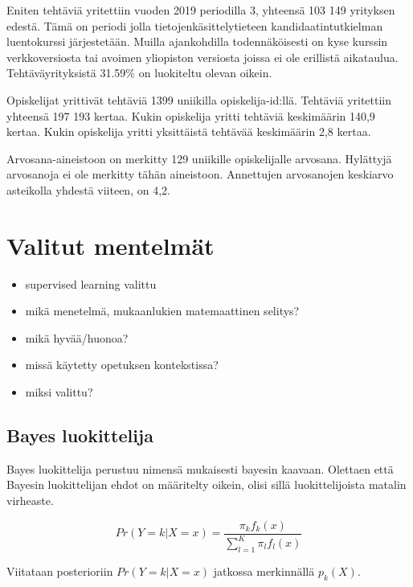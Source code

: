 \documentclass[finnish,twoside,openright]{HYgraduMLDS}
\begin{document}
Eniten tehtäviä yritettiin vuoden 2019 periodilla 3, yhteensä 103 149 yrityksen edestä. Tämä on periodi jolla tietojenkäsittelytieteen kandidaatintutkielman luentokurssi järjestetään. Muilla ajankohdilla todennäköisesti on kyse kurssin verkkoversiosta tai avoimen yliopiston versiosta joissa ei ole erillistä aikataulua. Tehtäväyrityksistä 31.59\% on luokiteltu olevan oikein.

Opiskelijat yrittivät tehtäviä 1399 uniikilla opiskelija-id:llä. Tehtäviä yritettiin yhteensä 197 193 kertaa. Kukin opiskelija yritti tehtäviä keskimäärin 140,9 kertaa. Kukin opiskelija yritti yksittäistä tehtävää keskimäärin 2,8 kertaa.

Arvosana-aineistoon on merkitty 129 uniikille opiskelijalle arvosana. Hylättyjä arvosanoja ei ole merkitty tähän aineistoon. Annettujen arvosanojen keskiarvo asteikolla yhdestä viiteen, on 4,2.

\section{Valitut mentelmät}

\begin{itemize}
    \item supervised learning valittu
\end{itemize}

\begin{itemize}
    \item mikä menetelmä, mukaanlukien matemaattinen selitys?
    \item mikä hyvää/huonoa?
    \item missä käytetty opetuksen kontekstissa?
    \item miksi valittu?
\end{itemize}

\subsection{Bayes luokittelija}

Bayes luokittelija perustuu nimensä mukaisesti bayesin kaavaan\cite{james2013ISLR}. Olettaen että Bayesin luokittelijan ehdot on määritelty oikein, olisi sillä luokittelijoista matalin virheaste\cite{james2013ISLR}.

\begin{equation} \label{eq:bayes}
    Pr(Y = k | X = x) = \frac{\pi_k f_k(x)}{\sum^K_{l=1} \pi_l f_l(x)}
\end{equation}

Viitataan posterioriin $Pr(Y = k | X = x)$ jatkossa merkinnällä $p_k(X)$.
\end{document}
